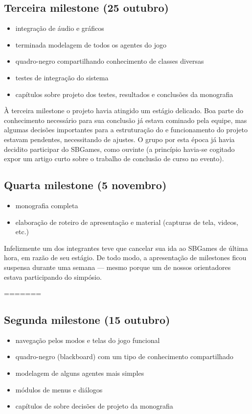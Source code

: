 \subsection{Terceira milestone (25 outubro)}
\begin{itemize}
\item integração de áudio e gráficos
\item terminada modelagem de todos os agentes do jogo
\item quadro-negro compartilhando conhecimento de classes diversas
\item testes de integração do sistema
\item capítulos sobre projeto dos testes, resultados e conclusões da monografia
\end{itemize}

À terceira milestone o projeto havia atingido um estágio delicado. Boa parte do conhecimento necessário para sua conclusão já estava cominado pela equipe, mas algumas decisões importantes para a estruturação do e funcionamento do projeto estavam pendentes, necessitando de ajustes. O grupo por esta época já havia decidito participar do SBGames, como ouvinte (a princípio havia-se cogitado expor um artigo curto sobre o trabalho de conclusão de curso no evento).   

\subsection{Quarta milestone (5 novembro)}
\begin{itemize}
\item monografia completa
\item elaboração de roteiro de apresentação e material (capturas de tela, videos, etc.)
\end{itemize}

Infelizmente um dos integrantes teve que cancelar sua ida ao SBGames de última hora, em razão de seu estágio. De todo modo, a apresentação de milestones ficou suspensa durante uma semana --- mesmo porque um de nossos orientadores estava participando do simpósio.


=======
\subsection{Segunda milestone (15 outubro)}
\begin{itemize}
\item navegação pelos modos e telas do jogo funcional
\item quadro-negro (blackboard) com um tipo de conhecimento compartilhado
\item modelagem de alguns agentes mais simples
\item módulos de menus e diálogos
\item capítulos de sobre decisões de projeto da monografia
\end{itemize}

